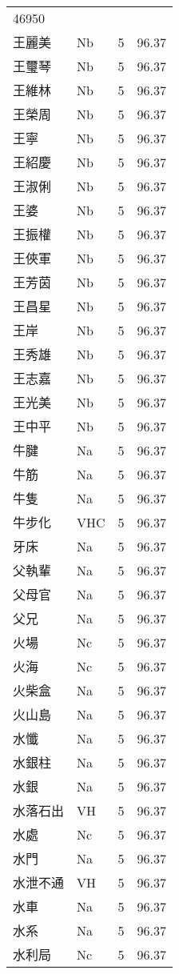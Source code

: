 \documentclass[twocolumn]{book}
\begin{document}
\begin{supertabular}{llrr}
46950\\
王麗美 & Nb & 5 &  96.37\\
王璽琴 & Nb & 5 &  96.37\\
王維林 & Nb & 5 &  96.37\\
王榮周 & Nb & 5 &  96.37\\
王寧 & Nb & 5 &  96.37\\
王紹慶 & Nb & 5 &  96.37\\
王淑俐 & Nb & 5 &  96.37\\
王婆 & Nb & 5 &  96.37\\
王振權 & Nb & 5 &  96.37\\
王俠軍 & Nb & 5 &  96.37\\
王芳茵 & Nb & 5 &  96.37\\
王昌星 & Nb & 5 &  96.37\\
王岸 & Nb & 5 &  96.37\\
王秀雄 & Nb & 5 &  96.37\\
王志嘉 & Nb & 5 &  96.37\\
王光美 & Nb & 5 &  96.37\\
王中平 & Nb & 5 &  96.37\\
牛腱 & Na & 5 &  96.37\\
牛筋 & Na & 5 &  96.37\\
牛隻 & Na & 5 &  96.37\\
牛步化 & VHC & 5 &  96.37\\
牙床 & Na & 5 &  96.37\\
父執輩 & Na & 5 &  96.37\\
父母官 & Na & 5 &  96.37\\
父兄 & Na & 5 &  96.37\\
火場 & Nc & 5 &  96.37\\
火海 & Nc & 5 &  96.37\\
火柴盒 & Na & 5 &  96.37\\
火山島 & Na & 5 &  96.37\\
水懺 & Na & 5 &  96.37\\
水銀柱 & Na & 5 &  96.37\\
水銀 & Na & 5 &  96.37\\
水落石出 & VH & 5 &  96.37\\
水處 & Nc & 5 &  96.37\\
水門 & Na & 5 &  96.37\\
水泄不通 & VH & 5 &  96.37\\
水車 & Na & 5 &  96.37\\
水系 & Na & 5 &  96.37\\
水利局 & Nc & 5 &  96.37\\

\end{supertabular}
\end{document}
